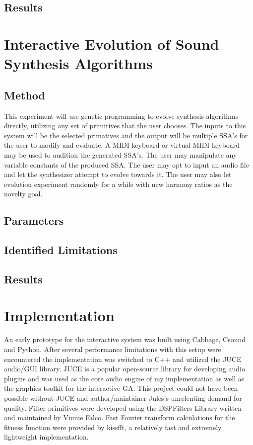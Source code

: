 \documentclass[12pt]{article}
\begin{document}
\subsection{Results}

\section{Interactive Evolution of Sound Synthesis Algorithms}
\subsection{Method}
This experiment will use genetic programming to evolve synthesis algorithms directly, utilizing any set of primitives that the user chooses. The inputs to this system will be the selected primatives and the output will be multiple SSA's for the user to modify and evaluate. A MIDI keyboard or virtual MIDI keyboard may be used to audition the generated SSA's. The user may manipulate any variable constants of the produced SSA. The user may opt to input an audio file and let the synthesizer attempt to evolve towards it. The user may also let evolution experiment randomly for a while with new harmony ratios as the novelty goal.
\subsection{Parameters}
\subsection{Identified Limitations}
\subsection{Results}

\section{Implementation}
An early prototype for the interactive system was built using Cabbage, Csound and Python. After several performance limitations with this setup were encountered the implementation was switched to C++ and utilized the JUCE audio/GUI library. JUCE is a popular open-source library for developing audio plugins and was used as the core audio engine of my implementation as well as the graphics toolkit for the interactive GA. This project could not have been possible without JUCE and author/maintainer Jules's unrelenting demand for quality. Filter primitives were developed using the DSPFilters Library written and maintained by Vinnie Falco. Fast Fourier transform calculations for the fitness function were provided by kissfft, a relatively fast and extremely lightweight implementation.
	
\end{document}
